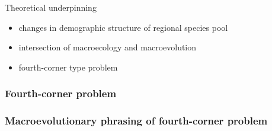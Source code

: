 \documentclass{beamer}
\begin{document}
\begin{frame}
  \begin{block}{Theoretical underpinning}
    \begin{itemize}
      \item changes in demographic structure of regional species pool
      \item intersection of macroecology and macroevolution
      \item fourth-corner type problem
    \end{itemize}
  \end{block}
\end{frame}

\begin{frame}
  \frametitle{Fourth-corner problem}
\end{frame}

\begin{frame}
  \frametitle{Macroevolutionary phrasing of fourth-corner problem}
\end{frame}
\end{document}
